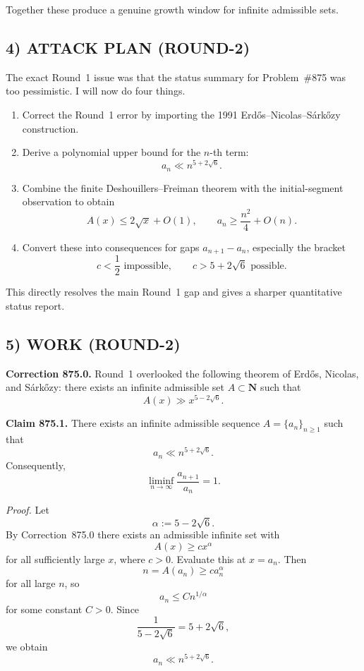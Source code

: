 Together these produce a genuine growth window for infinite admissible sets.

\subsection*{4) ATTACK PLAN (ROUND-2)}

The exact Round~1 issue was that the status summary for Problem~\#875 was too pessimistic. I will now do four things.

\begin{enumerate}
\item Correct the Round~1 error by importing the 1991 Erd\H{o}s--Nicolas--S\'ark\H{o}zy construction.
\item Derive a polynomial upper bound for the \(n\)-th term:
\[
a_n\ll n^{5+2\sqrt 6}.
\]
\item Combine the finite Deshouillers--Freiman theorem with the initial-segment observation to obtain
\[
A(x)\le 2\sqrt x+O(1),\qquad a_n\ge \frac{n^2}{4}+O(n).
\]
\item Convert these into consequences for gaps \(a_{n+1}-a_n\), especially the bracket
\[
c<\frac12 \text{ impossible},\qquad c>5+2\sqrt 6 \text{ possible}.
\]
\end{enumerate}

This directly resolves the main Round~1 gap and gives a sharper quantitative status report.

\subsection*{5) WORK (ROUND-2)}

\medskip
\noindent\textbf{Correction 875.0.}
Round~1 overlooked the following theorem of Erd\H{o}s, Nicolas, and S\'ark\H{o}zy: there exists an infinite admissible set \(A\subset \mathbf{N}\) such that
\[
A(x)\gg x^{5-2\sqrt 6}.
\]

\medskip
\noindent\textbf{Claim 875.1.}
There exists an infinite admissible sequence \(A=\{a_n\}_{n\ge 1}\) such that
\[
a_n\ll n^{5+2\sqrt 6}.
\]
Consequently,
\[
\liminf_{n\to\infty}\frac{a_{n+1}}{a_n}=1.
\]

\medskip
\noindent\emph{Proof.}
Let
\[
\alpha:=5-2\sqrt 6.
\]
By Correction~875.0 there exists an admissible infinite set with
\[
A(x)\ge c x^\alpha
\]
for all sufficiently large \(x\), where \(c>0\). Evaluate this at \(x=a_n\). Then
\[
n=A(a_n)\ge c a_n^\alpha
\]
for all large \(n\), so
\[
a_n\le C n^{1/\alpha}
\]
for some constant \(C>0\). Since
\[
\frac1{5-2\sqrt6}=5+2\sqrt6,
\]
we obtain
\[
a_n\ll n^{5+2\sqrt6}.
\]

